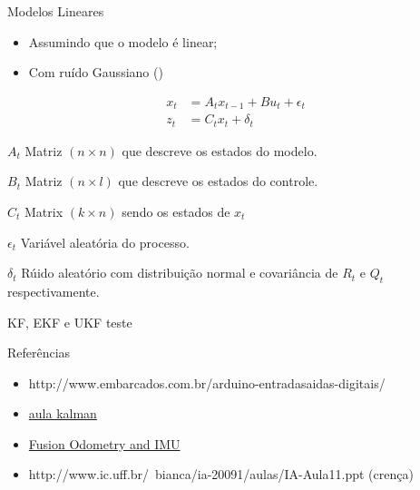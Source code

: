 \documentclass{beamer}
\begin{document}
\begin{frame}{Modelos Lineares}
    \begin{itemize}
        \item Assumindo que o modelo é linear;
        \item Com ruído Gaussiano ()
    \end{itemize}

    \begin{align} 
        x_t &= A_t x_{t-1} + B u_t + \epsilon_t\\ 
        z_t &= C_t x_t + \delta_t
        \end{align}

        $A_t$ Matriz $(n \times n)$ que descreve os estados do modelo.

        $B_t$ Matriz $(n \times l)$ que descreve os estados do controle.

        $C_t$ Matrix $(k\times n)$ sendo os estados de $x_t$

        $\epsilon_t$ Variável aleatória do processo.

        $\delta_t$ Rúido aleatório com distribuição normal e covariância de $R_t$ e $Q_t$ respectivamente.

\end{frame}


\begin{frame}{KF, EKF e UKF}
  teste
\end{frame}

\begin{frame}[t]{Referências}
    \begin{itemize}
        \item http://www.embarcados.com.br/arduino-entradasaidas-digitais/
        \item \href{https://www.youtube.com/watch?v=DE6Jn2cB4J4&list=PLgnQpQtFTOGQrZ4O5QzbIHgl3b1JHimN_&index=5}{aula kalman} 
        \item \href{https://www.youtube.com/watch?v=QZ5q59H2qaI}{Fusion Odometry and IMU}
        \item http://www.ic.uff.br/~bianca/ia-20091/aulas/IA-Aula11.ppt (crença)
    \end{itemize}
\end{frame}
\end{document}

